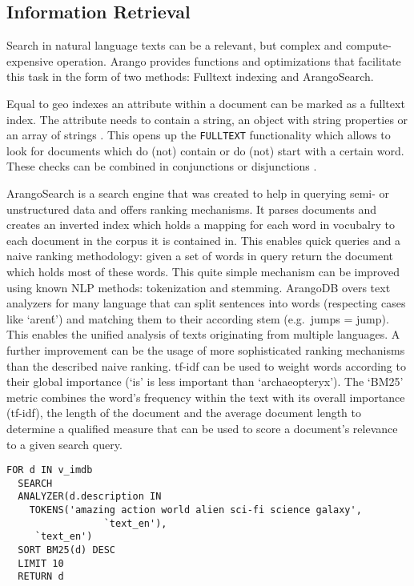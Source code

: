 \subsection{Information Retrieval}

Search in natural language texts can be a relevant, but complex and compute-expensive operation. Arango provides functions and optimizations that facilitate this task in the form of two methods: Fulltext indexing and ArangoSearch.

Equal to geo indexes an attribute within a document can be marked as a fulltext index. The attribute needs to contain a string, an object with string properties or an array of strings \cite{FulltextIndex}. This opens up the \texttt{FULLTEXT} functionality which allows to look for documents which do (not) contain or do (not) start with a certain word. These checks can be combined in conjunctions or disjunctions \cite{FulltextFunc}.

ArangoSearch is a search engine that was created to help in querying semi- or unstructured data and offers ranking mechanisms. It parses documents and creates an inverted index which holds a mapping for each word in vocubalry to each document in the corpus it is contained in. This enables quick queries and a naive ranking methodology: given a set of words in query return the document which holds most of these words.
This quite simple mechanism can be improved using known NLP methods: tokenization and stemming. ArangoDB overs text analyzers for many language that can split sentences into words (respecting cases like `aren\'t') and matching them to their according stem (e.g.\ jumps = jump). This enables the unified analysis of texts originating from multiple languages.
A further improvement can be the usage of more sophisticated ranking mechanisms than the described naive ranking. \gls{tf-idf} can be used to weight words according to their global importance (`is' is less important than `archaeopteryx').
The `BM25' metric combines the word's frequency within the text with its overall importance (\gls{tf-idf}), the length of the document and the average document length to determine a qualified measure that can be used to score a document's relevance to a given search query. \cite{ArangoSearchTut}

\begin{lstlisting}[language=ArangoQL,caption={Searching a database of movie descriptions}]
FOR d IN v_imdb 
  SEARCH 
  ANALYZER(d.description IN 
    TOKENS('amazing action world alien sci-fi science galaxy', 
                 `text_en'),
     `text_en')
  SORT BM25(d) DESC 
  LIMIT 10 
  RETURN d
\end{lstlisting}

